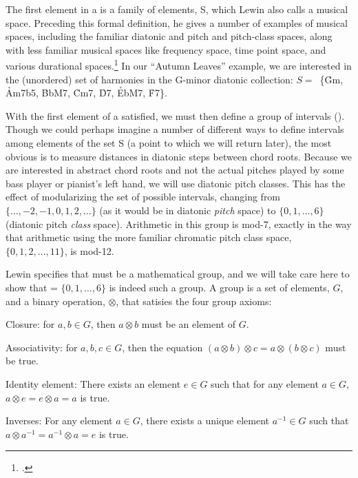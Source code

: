 \documentclass[diss]{subfiles}
\begin{document}
The first element in a \gis{} is a family of elements, S, which Lewin also calls
a musical space. Preceding this formal definition, he gives a number of
examples of musical spaces, including the familiar diatonic and pitch and
pitch-class spaces, along with less familiar musical spaces like frequency
space, time point space, and various durational
spaces.\footcite[16--25]{lewin:gmit} In our “Autumn Leaves” example, we are
interested in the (unordered) set of harmonies in the G-minor diatonic
collection: \mbox{$S =$ \{\h{Gm},} \h{Am7b5}, \h{BbM7}, \h{Cm7}, \h{D7},
\h{EbM7}, \h{F7}\}.

With the first element of a \gis{} satisfied, we must then define a group of
intervals (\ivls). Though we could perhaps imagine a number of
different ways to define intervals among elements of the set S (a point to
which we will return later), the most obvious is to measure distances in
diatonic steps between chord roots. Because we are interested in abstract
chord roots and not the actual pitches played by some bass player or pianist’s
left hand, we will use diatonic pitch classes. This has the effect of
modularizing the set of possible intervals, changing \ivls{} from
$\{\ldots,-2,-1,0,1,2,\ldots\}$ (as it would be in diatonic \emph{pitch}
space) to $\{0,1,\ldots,6\}$ (diatonic pitch \emph{class} space).
Arithmetic in this group is mod-7, exactly in the way that arithmetic using
the more familiar chromatic pitch class space, $\{0,1,2,\ldots,11\}$, is
mod-12.

Lewin specifies that \ivls{} must be a mathematical group, and we will take care
here to show that \ivls{} = $\{0,1,\ldots,6\}$ is indeed such a group. A group
is a set of elements, $G$, and a binary operation, $\otimes$, that satisies the
four group axioms:
\begin{compactitem}
  \singlespacing
  \item Closure: for $a, b \in  G$, then $a \otimes b$ must be an
    element of $G$.
  \item Associativity: for $a, b, c \in G$, then the equation $(a \otimes b)
    \otimes c = a \otimes (b \otimes c)$ must be true.
  \item Identity element: There exists an element $e \in G$ such that for any
    element $a \in G$, $a \otimes e = e \otimes a = a$ is true.
  \item Inverses: For any element $a \in G$, there exists a unique element
    $a^{-1} \in G$ such that $a \otimes a^{-1} = a^{-1} \otimes a = e$ is
    true.
\end{compactitem}
\end{document}
